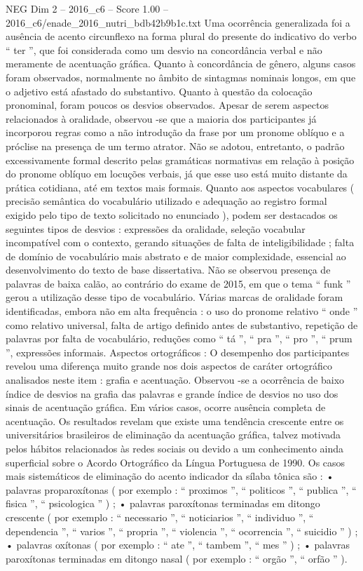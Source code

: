 \begin{textsample}{NEG Dim 2 – 2016\_c6 – Score 1.00 – 2016\_c6/enade\_2016\_nutri\_bdb42b9b1c.txt}
Uma ocorrência generalizada foi a ausência de acento circunflexo na forma plural do presente do indicativo do verbo “ ter ”, que foi considerada como um desvio na concordância verbal e não meramente de acentuação gráfica.
Quanto à concordância de gênero, alguns casos foram observados, normalmente no âmbito de sintagmas nominais longos, em que o adjetivo está afastado do substantivo.
Quanto à questão da colocação pronominal, foram poucos os desvios observados.
Apesar de serem aspectos relacionados à oralidade, observou -se que a maioria dos participantes já incorporou regras como a não introdução da frase por um pronome oblíquo e a próclise na presença de um termo atrator.
Não se adotou, entretanto, o padrão excessivamente formal descrito pelas gramáticas normativas em relação à posição do pronome oblíquo em locuções verbais, já que esse uso está muito distante da prática cotidiana, até em textos mais formais.
Quanto aos aspectos vocabulares ( precisão semântica do vocabulário utilizado e adequação ao registro formal exigido pelo tipo de texto solicitado no enunciado ), podem ser destacados os seguintes tipos de desvios : expressões da oralidade, seleção vocabular incompatível com o contexto, gerando situações de falta de inteligibilidade ; falta de domínio de vocabulário mais abstrato e de maior complexidade, essencial ao desenvolvimento do texto de base dissertativa.
Não se observou presença de palavras de baixa calão, ao contrário do exame de 2015, em que o tema “ funk ” gerou a utilização desse tipo de vocabulário.
Várias marcas de oralidade foram identificadas, embora não em alta frequência : o uso do pronome relativo “ onde ” como relativo universal, falta de artigo definido antes de substantivo, repetição de palavras por falta de vocabulário, reduções como “ tá ”, “ pra ”, “ pro ”, “ prum ”, expressões informais.
Aspectos ortográficos : O desempenho dos participantes revelou uma diferença muito grande nos dois aspectos de caráter ortográfico analisados neste item : grafia e acentuação.
Observou -se a ocorrência de baixo índice de desvios na grafia das palavras e grande índice de desvios no uso dos sinais de acentuação gráfica.
Em vários casos, ocorre ausência completa de acentuação.
Os resultados revelam que existe uma tendência crescente entre os universitários brasileiros de eliminação da acentuação gráfica, talvez motivada pelos hábitos relacionados às redes sociais ou devido a um conhecimento ainda superficial sobre o Acordo Ortográfico da Língua Portuguesa de 1990.
Os casos mais sistemáticos de eliminação do acento indicador da sílaba tônica são : • palavras proparoxítonas ( por exemplo : “ proximos ”, “ politicos ”, “ publica ”, “ fisica ”, “ psicologica ” ) ; • palavras paroxítonas terminadas em ditongo crescente ( por exemplo : “ necessario ”, “ noticiarios ”, “ individuo ”, “ dependencia ”, “ varios ”, “ propria ”, “ violencia ”, “ ocorrencia ”, “ suicidio ” ) ; • palavras oxítonas ( por exemplo : “ ate ”, “ tambem ”, “ mes ” ) ; • palavras paroxítonas terminadas em ditongo nasal ( por exemplo : “ orgão ”, “ orfão ” ).

\end{textsample}
